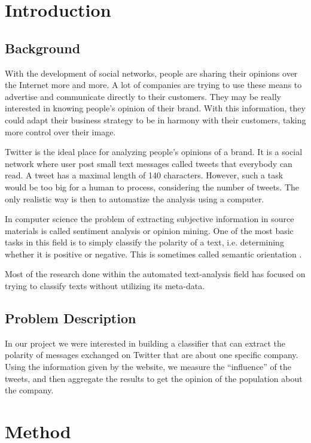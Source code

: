 \documentclass[a4paper,12pt]{report}
\begin{document}
\tableofcontents

\clearpage
\chapter{Introduction}

\section{Background}
With the development of social networks, people are sharing their opinions over the Internet more and more.
A lot of companies are trying to use these means to advertise and communicate directly to their customers.
They may be really interested in knowing people's opinion of their brand.
With this information, they could adapt their business strategy to be in harmony with their customers, taking more control over their image.

Twitter \cite{TwitterAbout} is the ideal place for analyzing people's opinions of a brand. 
It is a social network where user post small text messages called tweets that everybody can read. 
A tweet has a maximal length of 140 characters. However, such a task would be too big for a human to process, considering the number of tweets.
The only realistic way is then to automatize the analysis using a computer.

In computer science the problem of extracting subjective information in source materials is called sentiment analysis or opinion mining. 
One of the most basic tasks in this field is to simply classify the polarity of a text, i.e. determining whether it is positive or negative. 
This is sometimes called semantic orientation \cite{SenWiki}. 

Most of the research done within the automated text-analysis field has focused on trying to classify texts without utilizing its meta-data.

\section{Problem Description}

In our project we were interested in building a classifier that can extract the polarity of messages exchanged on Twitter that are about one specific company. Using the information given by the website, we measure the ``influence'' of the tweets, and then aggregate the results to get the opinion of the population about the company.

\chapter{Method}
\end{document}
